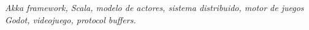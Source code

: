 \textit{
    Akka framework, Scala, modelo de actores, sistema distribuido, motor de juegos Godot, videojuego, protocol buffers.
}
